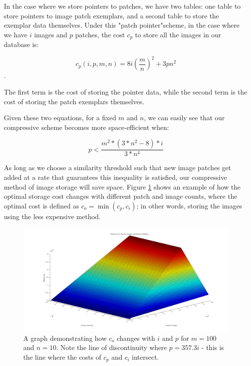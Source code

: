 In the case where we store pointers to patches, we have two tables: one table to store pointers to image patch exemplars, and a second table to store the exemplar data themselves.  Under this "patch pointer"scheme, in the case where we have $i$ images and $p$ patches, the cost $c_p$ to store all the images in our database is:

\begin{equation}
	c_p(i, p, m, n) = 8 i (\frac{m}{n})^2 + 3  p  n^2
\end{equation}.

The first term is the cost of storing the pointer data, while the second term is the cost of storing the patch exemplars themselves.

Given these two equations, for a fixed $m$ and $n$, we can easily see that our compressive scheme becomes more space-efficient when:

\begin{equation}
	p < \frac{m^2 * (3*n^2 - 8) * i}{3*n^4}
\end{equation}

As long as we choose a similarity threshold such that new image patches get added at a rate that guarantees this inequality is satisfied, our compressive method of image storage will save space.  Figure \ref{fig:optcost} shows an example of how the optimal storage cost changes with different patch and image counts, where the optimal cost is defined as $c_o = \min{(c_p, c_i)}$; in other words, storing the images using the less expensive method.

 \begin{figure}
\includegraphics[width=1\linewidth]{Figures/PatchCosts.png}
\caption{A graph demonstrating how $c_o$ changes with $i$ and $p$ for $m=100$ and $n=10$.  Note the line of discontinuity where $p = 357.3 i$ - this is the line where the costs of $c_p$ and $c_i$ intersect.}
\label{fig:optcost}
\end{figure}


